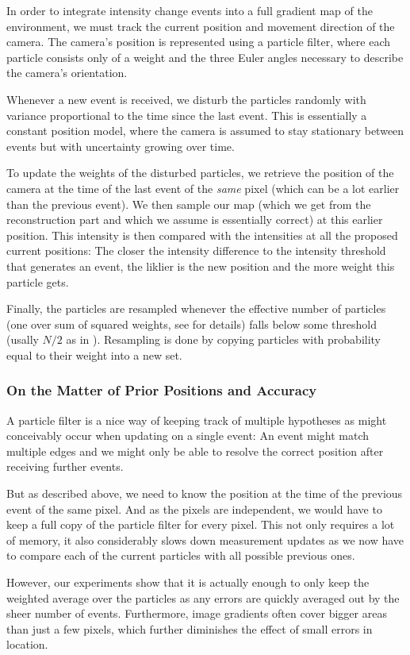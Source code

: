 In order to integrate intensity change events into a full gradient map of the
environment, we must track the current position and movement direction of the
camera.
The camera's position is represented using a particle filter, where each
particle consists only of a weight and the three Euler angles necessary to
describe the camera's orientation.

Whenever a new event is received, we disturb the particles randomly with
variance proportional to the time since the last event. This is essentially a
constant position model, where the camera is assumed to stay stationary between
events but with uncertainty growing over time.

To update the weights of the disturbed particles, we retrieve the position of
the camera at the time of the last event of the \textit{same} pixel (which can be a
lot earlier than the previous event). We then sample our map (which we get from the
reconstruction part and which we assume is essentially correct) at this earlier
position. This intensity is then compared with the intensities at all the
proposed current positions: The closer the intensity difference to the
intensity threshold that generates an event, the liklier is the new position
and the more weight this particle gets.

Finally, the particles are resampled whenever the effective number of particles
(one over sum of squared weights, see \cite{kim2014simultaneous} for details)
falls below some threshold (usally $N/2$ as in \cite{kim2014simultaneous}).
Resampling is done by copying particles with probability equal to their weight
into a new set.

\subsubsection{On the Matter of Prior Positions and Accuracy}

A particle filter is a nice way of keeping track of multiple hypotheses as
might conceivably occur when updating on a single event: An event might match
multiple edges and we might only be able to resolve the correct position after
receiving further events.

But as described above, we need to know the position at the time of the
previous event of the same pixel. And as the pixels are independent, we would
have to keep a full copy of the particle filter for every pixel. This not only
requires a lot of memory, it also considerably slows down measurement updates
as we now have to compare each of the current particles with all possible
previous ones.

However, our experiments show that it is actually enough to only keep the
weighted average over the particles as any errors are quickly averaged out by
the sheer number of events. Furthermore, image gradients often cover bigger
areas than just a few pixels, which further diminishes the effect of small
errors in location.

